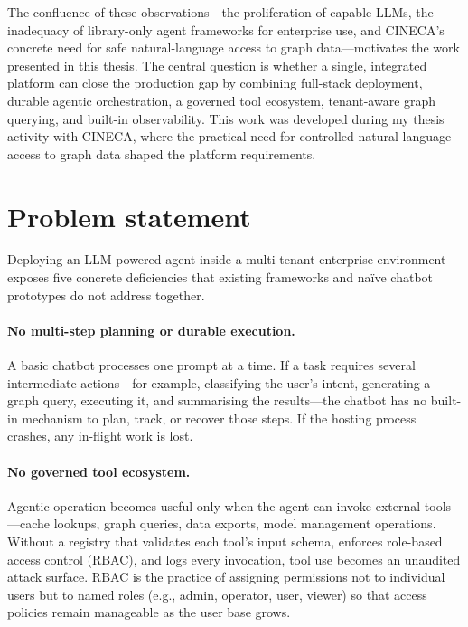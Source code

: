 \documentclass[a4paper,noexaminfo]{sapthesis}
\begin{document}
The confluence of these observations---the proliferation of capable LLMs, the
inadequacy of library-only agent frameworks for enterprise use, and CINECA's
concrete need for safe natural-language access to graph data---motivates the
work presented in this thesis.  The central question is whether a single,
integrated platform can close the production gap by combining full-stack
deployment, durable agentic orchestration, a governed tool ecosystem,
tenant-aware graph querying, and built-in observability.  This work was
developed during my thesis activity with CINECA, where the practical need
for controlled natural-language access to graph data shaped the platform
requirements.

\section{Problem statement}
\label{sec:problem-statement}

Deploying an LLM-powered agent inside a multi-tenant enterprise environment
exposes five concrete deficiencies that existing frameworks and na\"ive
chatbot prototypes do not address together.

\paragraph{No multi-step planning or durable execution.}
A basic chatbot processes one prompt at a time.  If a task requires several
intermediate actions---for example, classifying the user's intent,
generating a graph query, executing it, and summarising the results---the
chatbot has no built-in mechanism to plan, track, or recover those steps.
If the hosting process crashes, any in-flight work is lost.

\paragraph{No governed tool ecosystem.}
Agentic operation becomes useful only when the agent can invoke external
tools---cache lookups, graph queries, data exports, model management
operations.  Without a registry that validates each tool's input schema,
enforces role-based access control (RBAC), and logs every invocation, tool
use becomes an unaudited attack surface.  RBAC is the practice of assigning
permissions not to individual users but to named roles (e.g., admin,
operator, user, viewer) so that access policies remain manageable as the
user base grows.
\end{document}
